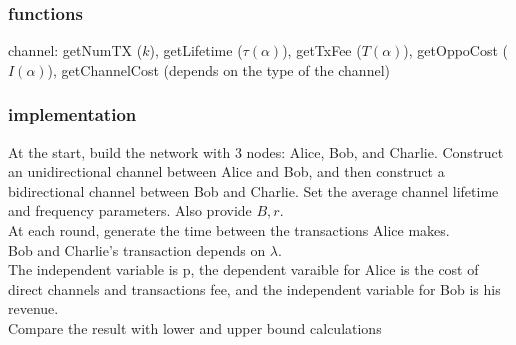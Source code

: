 \documentclass[12pt]{article}
\theoremstyle{plain}
\theoremstyle{remark}
\theoremstyle{definition}
\begin{document}
\subsubsection{functions} 

channel: getNumTX ($k$), getLifetime ($\tau(\alpha)$), getTxFee ($T(\alpha)$), getOppoCost ($I(\alpha)$), getChannelCost (depends on the type of the channel)

\subsubsection{implementation}
At the start, build the network with 3 nodes: Alice, Bob, and Charlie. Construct an unidirectional channel between Alice and Bob, and then construct a bidirectional channel between Bob and Charlie. Set the average channel lifetime and frequency parameters. Also provide $B,r$. 
\\ At each round, generate the time between the transactions Alice makes. 
\\ Bob and Charlie's transaction depends on $\lambda$.
\\ The independent variable is p, the dependent varaible for Alice is the cost of direct channels and transactions fee, and the independent variable for Bob is his revenue. 
\\ Compare the result with lower and upper bound calculations
\end{document}
